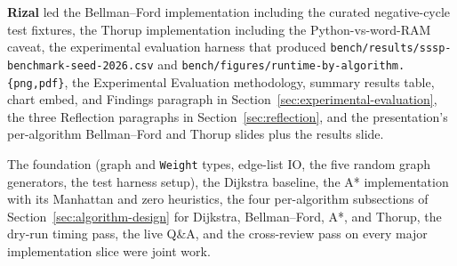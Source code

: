 \documentclass[12pt]{article}
\begin{document}
\textbf{Rizal} led the Bellman--Ford implementation including the curated negative-cycle test fixtures, the Thorup implementation including the Python-vs-word-RAM caveat, the experimental evaluation harness that produced \texttt{bench/results/sssp-benchmark-seed-2026.csv} and \texttt{bench/figures/runtime-by-algorithm.\{png,pdf\}}, the Experimental Evaluation methodology, summary results table, chart embed, and Findings paragraph in Section~\ref{sec:experimental-evaluation}, the three Reflection paragraphs in Section~\ref{sec:reflection}, and the presentation's per-algorithm Bellman--Ford and Thorup slides plus the results slide.
\medskip

The foundation (graph and \texttt{Weight} types, edge-list IO, the five random graph generators, the test harness setup), the Dijkstra baseline, the A* implementation with its Manhattan and zero heuristics, the four per-algorithm subsections of Section~\ref{sec:algorithm-design} for Dijkstra, Bellman--Ford, A*, and Thorup, the dry-run timing pass, the live Q\&A, and the cross-review pass on every major implementation slice were joint work.

\newpage



\end{document}
